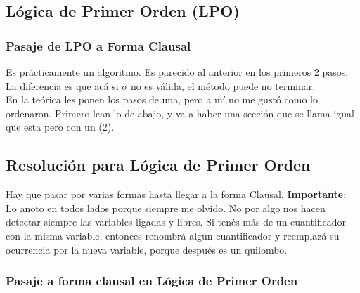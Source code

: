 \documentclass[10pt,a4paper]{article}
\begin{document}
\subsection*{Lógica de Primer Orden (LPO)}
\subsubsection*{Pasaje de LPO a Forma Clausal}
Es prácticamente un algoritmo. Es parecido al anterior en los primeros 2 pasos. La diferencia es que acá si $\sigma$ no es válida, el método puede no terminar. \\
En la teórica les ponen los pasos de una, pero a mí no me gustó como lo ordenaron. Primero lean lo de abajo, y va a haber una sección que se llama igual que esta pero con un (2). 
\subsection*{Resolución para Lógica de Primer Orden}
Hay que pasar por varias formas hasta llegar a la forma Clausal.
\textbf{Importante}: Lo anoto en todos lados porque siempre me olvido. No por algo nos hacen detectar siempre las variables ligadas y libres. Si tenés más de un cuantificador con la misma variable, entonces renombrá algun cuantificador y reemplazá su ocurrencia por la nueva variable, porque después es un quilombo.
\subsubsection*{Pasaje a forma clausal en Lógica de Primer Orden}
\end{document}
